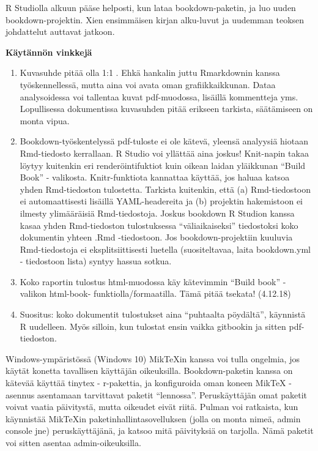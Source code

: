 \documentclass[finnish,]{book}
\begin{document}
R Studiolla alkuun pääse helposti, kun lataa bookdown-paketin, ja luo uuden bookdown-projektin. Xien ensimmäisen kirjan alku-luvut ja uudemman teoksen johdattelut auttavat jatkoon.

\textbf{Käytännön vinkkejä}

\begin{enumerate}
\def\labelenumi{\arabic{enumi}.}
\item
  Kuvasuhde pitää olla 1:1 . Ehkä hankalin juttu Rmarkdownin kanssa työskennellessä, mutta aina voi avata oman grafiikkaikkunan. Dataa analysoidessa voi tallentaa kuvat pdf-muodossa, lisäillä kommentteja yms. Lopullisessa dokumentissa kuvasuhden pitää erikseen tarkista, säätämiseen on monta vipua.
\item
  Bookdown-työskentelyssä pdf-tuloste ei ole kätevä, yleensä analyysiä hiotaan Rmd-tiedosto kerrallaan. R Studio voi yllättää aina joskus! Knit-napin takaa löytyy kuitenkin eri renderöintifuktiot kuin oikean laidan yläikkunan ``Build Book'' - valikosta. Knitr-funktiota kannattaa käyttää, jos haluaa katsoa yhden Rmd-tiedoston tulostetta. Tarkista kuitenkin, että (a) Rmd-tiedostoon ei automaattisesti lisäillä YAML-headereita ja (b) projektin hakemistoon ei ilmesty ylimääräisiä Rmd-tiedostoja. Joskus bookdown R Studion kanssa kasaa yhden Rmd-tiedoston tulostuksessa ``väliaikaiseksi'' tiedostoksi koko dokumentin yhteen .Rmd -tiedostoon. Jos bookdown-projektiin kuuluvia Rmd-tiedostoja ei eksplitsiittisesti luetella (suositeltavaa, laita bookdown.yml - tiedostoon lista) syntyy hassua sotkua.
\item
  Koko raportin tulostus html-muodossa käy kätevimmin ``Build book'' - valikon html-book- funktiolla/formaatilla. Tämä pitää tsekata! (4.12.18)
\item
  Suositus: koko dokumentit tulostukset aina ``puhtaalta pöydältä'', käynnistä R uudelleen. Myös silloin, kun tulostat ensin vaikka gitbookin ja sitten pdf-tiedoston.
\end{enumerate}

Windows-ympäristössä (Windows 10) MikTeXin kanssa voi tulla ongelmia, jos käytät konetta tavallisen käyttäjän oikeuksilla. Bookdown-paketin kanssa on kätevää käyttää tinytex - r-pakettia, ja konfiguroida oman koneen MikTeX - asennus asentamaan tarvittavat paketit ``lennossa''. Peruskäyttäjän omat paketit voivat vaatia päivitystä, mutta oikeudet eivät riitä. Pulman voi ratkaista, kun käynnistää MikTeXin paketinhallintasovelluksen (jolla on monta nimeä, admin console jne) peruskäyttäjänä, ja katsoo mitä päivityksiä on tarjolla. Nämä paketit voi sitten asentaa admin-oikeuksilla.
\end{document}
